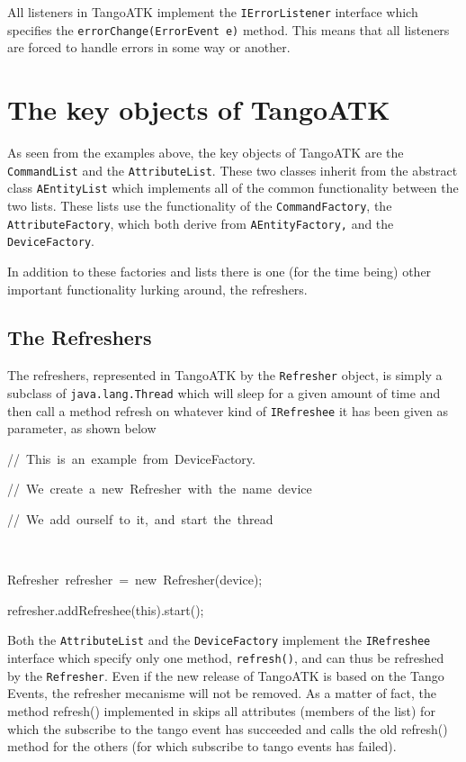 All listeners in TangoATK implement the \texttt{IErrorListener} interface
which specifies the \texttt{errorChange(ErrorEvent e)} method. This
means that all listeners are forced to handle errors in some way or
another.


\section{The key objects of TangoATK}

As seen from the examples above, the key objects of TangoATK are the
\texttt{CommandList} and the \texttt{AttributeList}.
These two classes inherit from the abstract class \texttt{AEntityList}
which implements all of the common functionality between the two lists.
These lists use the functionality of the \texttt{CommandFactory},
the \texttt{AttributeFactory}, which both derive from \texttt{AEntityFactory,}
and the \texttt{DeviceFactory}.

In addition to these factories and lists there is one (for the time
being) other important functionality lurking around, the refreshers.


\subsection{The Refreshers}

The refreshers, represented in TangoATK by the \texttt{Refresher}
object, is simply a subclass of \texttt{java.lang.Thread} which will
sleep for a given amount of time and then call a method refresh on
whatever kind of \texttt{IRefreshee} it has been given as parameter,
as shown below


\begin{lyxcode}
//~This~is~an~example~from~DeviceFactory.

//~We~create~a~new~Refresher~with~the~name~\textquotedbl{}device\textquotedbl{}

//~We~add~ourself~to~it,~and~start~the~thread

~



Refresher~refresher~=~new~Refresher(\textquotedbl{}device\textquotedbl{});

refresher.addRefreshee(this).start();


\end{lyxcode}


Both the \texttt{AttributeList} and the \texttt{DeviceFactory}
implement the \texttt{IRefreshee} interface which specify only one
method, \texttt{refresh()}, and can thus be refreshed by the \texttt{Refresher}.
Even if the new release of TangoATK is based on the Tango Events,
the refresher mecanisme will not be removed. As a matter of fact,
the method refresh() implemented in  skips all
attributes (members of the list) for which the subscribe
to the tango event has succeeded and calls the old refresh() method
for the others (for which subscribe to tango events has failed). 

